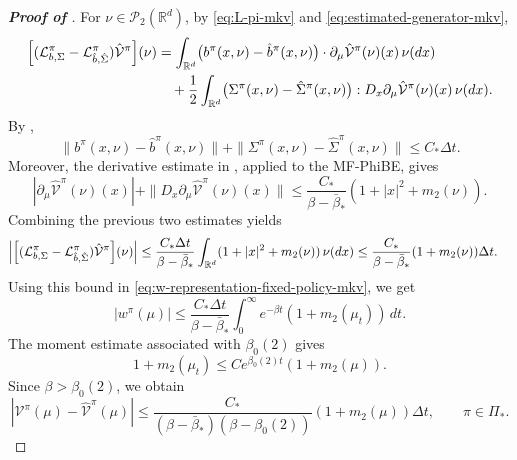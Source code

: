 \documentclass[a4paper, 10pt, english, reqno]{amsart}
\def\R{\mathbb R}
\begin{document}
\begin{proof}[\textbf{Proof of
}]
For $\nu\in\mathcal P_2(\R^d)$, by \eqref{eq:L-pi-mkv} and \eqref{eq:estimated-generator-mkv},
\[
\begin{aligned}
\Bigl[(\mathcal L_{b,\Sigma}^{\pi}-\mathcal L_{\hat b,\hat\Sigma}^{\pi})\hat{\mathcal V}^\pi\Bigr](\nu)
&=\int_{\R^d}\bigl(b^\pi(x,\nu)-\hat b^\pi(x,\nu)\bigr)\cdot\partial_\mu\hat{\mathcal V}^\pi(\nu)(x)\,\nu(dx) \\
&\quad+\frac12\int_{\R^d}\bigl(\Sigma^\pi(x,\nu)-\hat\Sigma^\pi(x,\nu)\bigr):D_x\partial_\mu\hat{\mathcal V}^\pi(\nu)(x)\,\nu(dx).
\end{aligned}
\]
By ,
\[
\|b^\pi(x,\nu)-\hat b^\pi(x,\nu)\|+\|\Sigma^\pi(x,\nu)-\hat\Sigma^\pi(x,\nu)\|\le C_*\Delta t.
\]
Moreover, the derivative estimate in , applied to the MF-PhiBE, gives
\[
|\partial_\mu\hat{\mathcal V}^\pi(\nu)(x)|+\|D_x\partial_\mu\hat{\mathcal V}^\pi(\nu)(x)\|\le\frac{C_*}{\beta-\bar\beta_*}(1+|x|^2+m_2(\nu)).
\]
Combining the previous two estimates yields
\[
\begin{aligned}
\left|\Bigl[(\mathcal L_{b,\Sigma}^{\pi}-\mathcal L_{\hat b,\hat\Sigma}^{\pi})\hat{\mathcal V}^\pi\Bigr](\nu)\right|
&\le\frac{C_*\Delta t}{\beta-\bar\beta_*}
\int_{\R^d}(1+|x|^2+m_2(\nu))\,\nu(dx)\le\frac{C_*}{\beta-\bar\beta_*}(1+m_2(\nu))\Delta t.
\end{aligned}
\]
Using this bound in \eqref{eq:w-representation-fixed-policy-mkv}, we get
\[
|w^\pi(\mu)|\le\frac{C_*\Delta t}{\beta-\bar\beta_*}\int_0^\infty e^{-\beta t}(1+m_2(\mu_t))\,dt.
\]
The moment estimate associated with $\beta_0(2)$ gives
\[
1+m_2(\mu_t)\le C e^{\beta_0(2)t}(1+m_2(\mu)).
\]
Since $\beta>\beta_0(2)$, we obtain
\begin{equation}
\label{eq:fixed-policy-error-final-mkv}
|\mathcal V^\pi(\mu)-\hat{\mathcal V}^\pi(\mu)|
\le
\frac{C_*}{(\beta-\bar\beta_*)(\beta-\beta_0(2))}
(1+m_2(\mu))\Delta t,
\qquad
\pi\in\Pi_*.
\end{equation}

\medskip


\end{proof}
\end{document}
